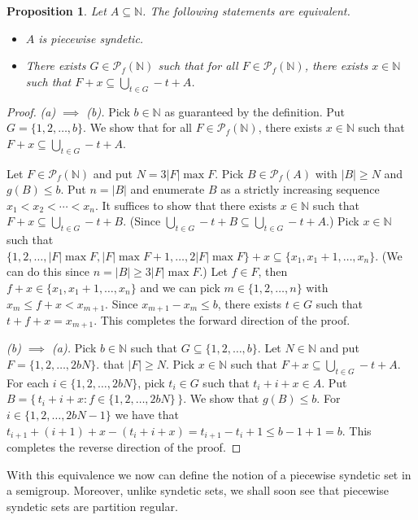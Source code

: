\documentclass[12pt,showtrims]{memoir}
\theoremstyle{plain}
\newtheorem{prop}[thm]{Proposition}
\theoremstyle{definition}
\newcommand{\bbN}{\mathbb{N}}
\newcommand{\Pf}{\mathcal{P}_f}
\begin{document}
\begin{prop}
  Let $A \subseteq \bbN$.
  The following statements are equivalent.
  \begin{itemize}
    \item[(a)] $A$ is piecewise syndetic.
    
    \item[(b)] There exists $G \in \Pf(\bbN)$ such that for all $F \in \Pf(\bbN)$, there exists $x \in \bbN$ such that $F+x \subseteq \bigcup_{t \in G} -t+A$. 
  \end{itemize}
\end{prop}
\begin{proof}
  \textsl{(a) $\implies$ (b).}
  Pick $b \in \bbN$ as guaranteed by the definition. 
  Put $G = \{1, 2, \ldots, b\}$.
  We show that for all $F \in \Pf(\bbN)$, there exists $x \in \bbN$ such that $F+x \subseteq \bigcup_{t \in G} -t + A$.

  Let $F \in \Pf(\bbN)$ and put $N = 3 |F| \max F$. 
  Pick $B \in \Pf(A)$ with $|B| \ge N$ and $g(B) \le b$. 
  Put $n = |B|$ and enumerate $B$ as a strictly increasing sequence $x_1 < x_2 < \cdots  < x_n$.
  It suffices to show that there exists $x \in \bbN$ such that $F + x \subseteq \bigcup_{t \in G} -t + B$.
  (Since $\bigcup_{t \in G} -t + B \subseteq \bigcup_{t \in G} -t + A$.)
  Pick $x \in \bbN$ such that $\{1, 2, \ldots, |F| \max F, |F| \max F + 1, \ldots, 2|F| \max F\} + x \subseteq \{x_1, x_1 + 1, \ldots, x_n\}$.
  (We can do this since $n = |B| \ge 3 |F| \max F$.)
  Let $f \in F$, then $f + x \in \{x_1, x_1 + 1, \ldots, x_n \}$ and we can pick $m \in \{1, 2, \ldots, n\}$ with $x_m \le f+x < x_{m+1}$. 
  Since $x_{m+1} - x_m \le b$, there exists $t \in G$ such that $t + f + x = x_{m+1}$. 
  This completes the forward direction of the proof.  
  
  \textsl{(b) $\implies$ (a).}
  Pick $b \in \bbN$ such that $G \subseteq \{1, 2, \ldots, b\}$. 
  Let $N \in \bbN$ and put $F = \{1, 2, \ldots, 2bN\}$. that $|F| \ge N$. 
  Pick $x \in \bbN$ such that $F + x \subseteq \bigcup_{t \in G} -t + A$. 
  For each $i \in \{1, 2, \ldots, 2bN\}$, pick $t_i \in G$ such that $t_i + i + x \in A$. 
  Put $B = \bigl\{\, t_i + i + x : f \in \{1, 2, \ldots, 2bN\} \,\bigr\}$. 
  We show that $g(B) \le b$. 
  For $i \in \{1, 2, \ldots, 2bN-1\}$ we have that $t_{i+1} + (i+1) + x - (t_i + i + x) = t_{i+1} - t_i + 1 \le b - 1 + 1 = b$.
  This completes the reverse direction of the proof.
\end{proof}

With this equivalence we now can define the notion of a piecewise
syndetic set in a semigroup. 
Moreover, unlike syndetic sets, we shall soon see that piecewise syndetic sets are partition regular.%
\end{document}
